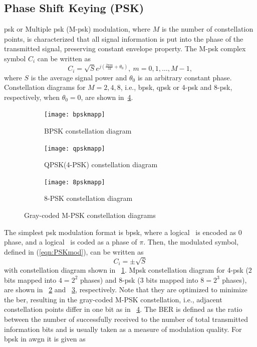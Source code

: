 \subsection{Phase Shift Keying (PSK)}
\gls{psk} or Multiple \gls{psk} (M-\gls{psk}) modulation, where $M$ is the number of constellation points, is characterized that all signal information is put into the phase of the transmitted signal, preserving constant envelope property. The M-\gls{psk} complex symbol $C_i$ can be written as
%
\begin{equation}
\label{eqn:PSKmod}
C_i=\sqrt{S}e^{j(\frac{2\pi m}{M} + \theta_0)},\ m = 0,1,\ldots,M-1,
\end{equation}
%
where $S$ is the average signal power and $\theta_0$ is an arbitrary constant phase. Constellation diagrams for $M=2,4,8$, i.e., \gls{bpsk}, \gls{qpsk} or 4-\gls{psk} and 8-\gls{psk}, respectively, when $\theta_0=0$, are shown in~\cref{fig:PSKconstell}.
%
\begin{figure}[thb]
\centering
    \begin{subfigure}[t]{0.3\textwidth}
    \texttt{[image: bpskmapp]}
    \caption{BPSK constellation diagram}\label{fig:BPSK}
    \end{subfigure}
\hfill
    \begin{subfigure}[t]{0.3\textwidth}
    \texttt{[image: qpskmapp]}
    \caption{QPSK(4-PSK) constellation diagram}\label{fig:QPSK}
    \end{subfigure}
\hfill
    \begin{subfigure}[t]{0.3\textwidth}
    \texttt{[image: 8pskmapp]}
    \caption{8-PSK constellation diagram}
    \label{fig:8PSK}
    \end{subfigure}
\caption{Gray-coded M-PSK constellation diagrams}
\label{fig:PSKconstell}
\end{figure}
%
The simplest \gls{psk} modulation format is \gls{bpsk}, where a logical \grqq\ is encoded as $0$ phase, and a logical \grqq\ is coded as a phase of $\pi$. Then, the modulated symbol, defined in (\ref{eqn:PSKmod}), can be written as
%
\begin{equation}
\label{eqn:BPSKmod}
C_i=\pm \sqrt{S}
\end{equation}
%
with constellation diagram shown in ~\cref{fig:BPSK}. M\gls{psk} constellation diagram for 4-\gls{psk} ($2$ bits mapped into $4=2^2$ phases) and 8-\gls{psk} ($3$ bits mapped into $8=2^3$ phases), are shown in ~\cref{fig:QPSK} and ~\cref{fig:8PSK}, respectively. Note that they are optimized to minimize the \gls{ber}, resulting in the gray-coded M-PSK constellation, i.e., adjacent constellation points differ in one bit as in ~\cref{fig:PSKconstell}. The BER is defined as the ratio between the number of successfully received to the number of total transmitted information bits and is usually taken as a measure of modulation quality. For \gls{bpsk} in \gls{awgn} it is given as \cite{WiComGoldsmith}
